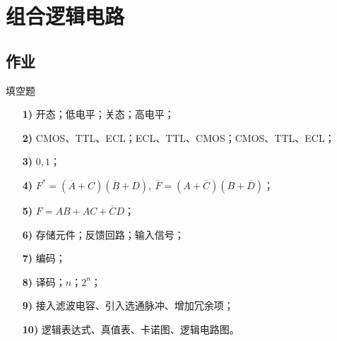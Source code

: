 \section{组合逻辑电路}

\subsection{作业}

\begin{problem}
    填空题
    \begin{solution}
        \begin{enumerate}
            \item[\textbf{1)}] 开态；低电平；关态；高电平；
            \item[\textbf{2)}] CMOS、TTL、ECL；ECL、TTL、CMOS；CMOS、TTL、ECL；
            \item[\textbf{3)}] $0, 1$；
            \item[\textbf{4)}] $F^* = (\overline{A} + C) (\overline{B} + D),\ \overline{F} = (A + \overline{C}) (B + \overline{D})$；
            \item[\textbf{5)}] $F = A B + A C + \overline{C} D$；
            \item[\textbf{6)}] 存储元件；反馈回路；输入信号；
            \item[\textbf{7)}] 编码；
            \item[\textbf{8)}] 译码；$n$；$2^{n}$；
            \item[\textbf{9)}] 接入滤波电容、引入选通脉冲、增加冗余项；
            \item[\textbf{10)}] 逻辑表达式、真值表、卡诺图、逻辑电路图。 
        \end{enumerate}
    \end{solution}
\end{problem}

